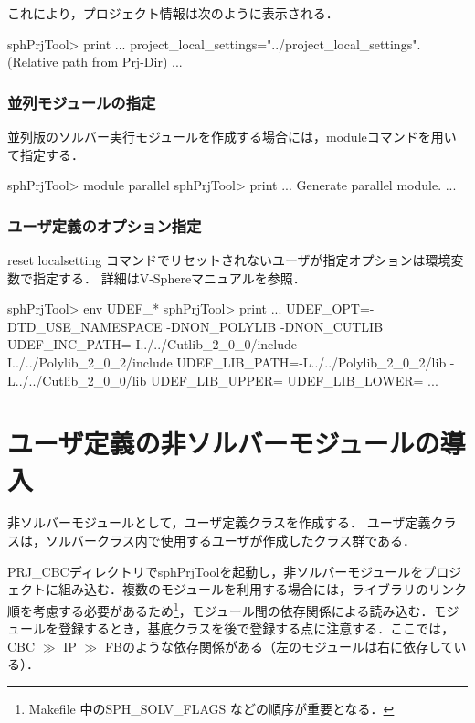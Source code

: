 \noindent これにより，プロジェクト情報は次のように表示される．

{\small
\begin{program}
sphPrjTool> print
    ...
    project_local_settings="../project_local_settings". (Relative path from Prj-Dir)
    ...
\end{program}
}

%
\subsubsection{並列モジュールの指定}
並列版のソルバー実行モジュールを作成する場合には，moduleコマンドを用いて指定する．
{\small
\begin{program}
sphPrjTool> module parallel
sphPrjTool> print
    ...
    Generate parallel module.
    ...
\end{program}
}

%
\subsubsection{ユーザ定義のオプション指定}
reset localsetting コマンドでリセットされないユーザが指定オプションは環境変数で指定する．
詳細はV-Sphereマニュアルを参照．

{\small
\begin{program}
sphPrjTool> env UDEF_*
sphPrjTool> print
   ...
   UDEF_OPT=-DTD_USE_NAMESPACE -DNON_POLYLIB -DNON_CUTLIB
   UDEF_INC_PATH=-I../../Cutlib_2_0_0/include -I../../Polylib_2_0_2/include
   UDEF_LIB_PATH=-L../../Polylib_2_0_2/lib -L../../Cutlib_2_0_0/lib
   UDEF_LIB_UPPER=
   UDEF_LIB_LOWER=
   ...
\end{program}
}

%
\section{ユーザ定義の非ソルバーモジュールの導入}
\label{sec:non-solver module}

非ソルバーモジュールとして，ユーザ定義クラスを作成する．
ユーザ定義クラスは，ソルバークラス内で使用するユーザが作成したクラス群である．

PRJ\_CBCディレクトリでsphPrjToolを起動し，非ソルバーモジュールをプロジェクトに組み込む．複数のモジュールを利用する場合には，ライブラリのリンク順を考慮する必要があるため\footnote{Makefile 中のSPH\_SOLV\_FLAGS などの順序が重要となる．}，モジュール間の依存関係による読み込む．モジュールを登録するとき，基底クラスを後で登録する点に注意する．ここでは，CBC $\gg$ IP $\gg$ FBのような依存関係がある（左のモジュールは右に依存している）．

